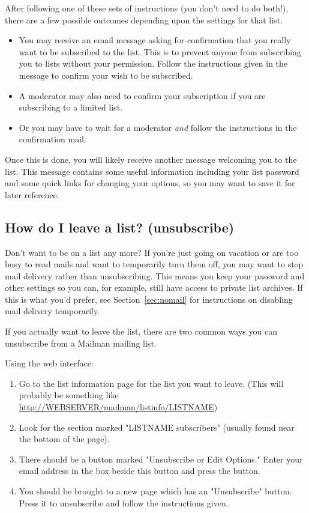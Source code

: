 \documentclass{howto}
\begin{document}
After following one of these sets of instructions (you don't need to do
both!), there are a few possible outcomes depending upon the settings for
that list. 
\begin{itemize}
	\item You may receive an email message asking for confirmation that you 
really want to be subscribed to the list.  This is to prevent anyone from
subscribing you to lists without your permission.  Follow the instructions
given in the message to confirm your wish to be subscribed.
	\item A moderator may also need
to confirm your subscription if you are subscribing to a limited list.  
	\item Or
you may have to wait for a moderator \textit{and} follow the instructions in
the confirmation mail.
\end{itemize}

Once this is done, you will likely receive another message welcoming you to
the list.  This message contains some useful information including your list
password and some quick links for changing your options, so you may want to
save it for later reference.


\subsection{How do I leave a list? (unsubscribe)\label{sec:unsubscribe}}

Don't want to be on a list any more?  If you're just going on vacation or
are too busy to read mails and want to temporarily turn them off, you may want
to stop mail delivery rather than unsubscribing.  This means you keep your
password and other settings so you can, for example, still have access to 
private list archives.  If this is what you'd
prefer, see Section~\ref{sec:nomail} for instructions on disabling mail
delivery temporarily.

If you actually want to leave the list, there are two common ways you can
unsubscribe from a Mailman mailing list.

Using the web interface:
\begin{enumerate}
	\item Go to the list information page for the list you want to leave.
	(This will probably be something like 
	\url{http://WEBSERVER/mailman/listinfo/LISTNAME})
	\item Look for the section marked "LISTNAME subscribers" (usually found 
	near the bottom of the page).
	\item There should be a button marked "Unsubscribe or Edit Options."  
	Enter your email address in the box beside this button and press the
	button.
	\item You should be brought to a new page which has an "Unsubscribe"
	button.  Press it to unsubscribe and follow the instructions given.
\end{enumerate}
\end{document}
